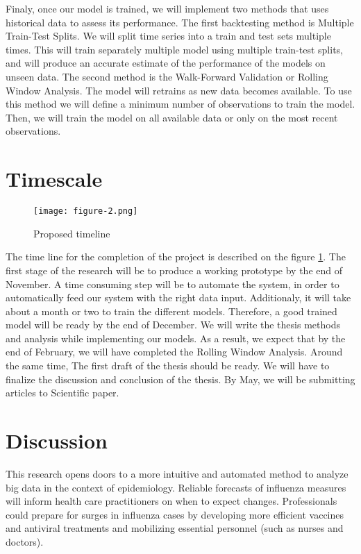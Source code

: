 \documentclass[12pt]{article}
\begin{document}
Finaly, once our model is trained, we will implement two methods that uses historical data to assess its performance. The first backtesting method is Multiple Train-Test Splits. We will split time series into a train and test sets multiple times. This will train separately multiple model using multiple train-test splits, and will produce an accurate estimate of the performance of the models on unseen data. The second method is the Walk-Forward Validation or Rolling Window Analysis. The model will retrains as new data becomes available. To use this method we will define a minimum number of observations to train the model. Then, we will train the model on all available data or only on the most recent observations.

\section{Timescale }

\begin{figure}[h]
    \centering
    \texttt{[image: figure-2.png]}
    \caption{ Proposed timeline}
    \label{fig:timeline}
\end{figure}

The time line for the completion of the project is described on the figure \ref{fig:timeline}. The first stage of the research  will be to produce a working prototype by the end of November. A time consuming step will be to automate the system, in order to automatically feed our system with the right data input. Additionaly, it will take about a month or two to train the different models. Therefore, a good trained model will be ready by the end of December. We will write the thesis methods and analysis while implementing our models. As a result, we expect that by the end of February, we will have completed the Rolling Window Analysis. Around the same time, The first draft of the thesis should be ready. We will have to finalize the discussion and conclusion of the thesis. By May, we will be submitting articles to Scientific paper. 
\newpage

\section{Discussion}

This research opens doors to a more intuitive and automated method to analyze big data in the context of epidemiology. Reliable forecasts of influenza measures will inform health care practitioners on when to expect changes. Professionals could prepare for surges in influenza cases by developing more efficient vaccines and antiviral treatments and mobilizing essential personnel (such as nurses and doctors).
\end{document}
